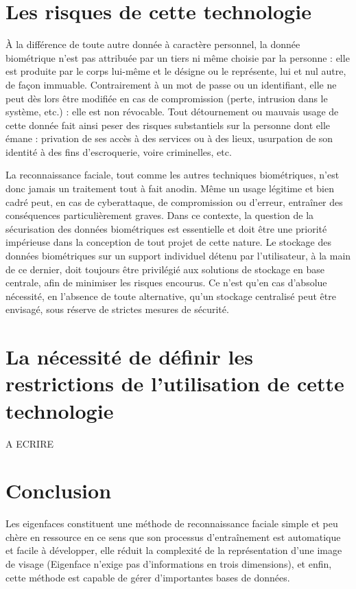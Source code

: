 \documentclass[12pt,french]{article}
\theoremstyle{plain}
\theoremstyle{definition}
\begin{document}
\section{Les risques de cette technologie}

À la différence de toute autre donnée à caractère personnel, la donnée biométrique n’est pas attribuée par un tiers ni même choisie par la personne : elle est produite par le corps lui-même et le désigne ou le représente, lui et nul autre, de façon immuable.
Contrairement à un mot de passe ou un identifiant, elle ne peut dès lors être modifiée en cas de compromission (perte, intrusion dans le système, etc.) : elle est non révocable.
Tout détournement ou mauvais usage de cette donnée fait ainsi peser des risques substantiels sur la personne dont elle émane : privation de ses accès à des services ou à des lieux, usurpation de son identité à des fins d’escroquerie, voire criminelles, etc.

La reconnaissance faciale, tout comme les autres techniques biométriques, n’est donc jamais un traitement tout à fait anodin.
Même un usage légitime et bien cadré peut, en cas de cyberattaque, de compromission ou d’erreur, entraîner des conséquences particulièrement graves.
Dans ce contexte, la question de la sécurisation des données biométriques est essentielle et doit être une priorité impérieuse dans la conception de tout projet de cette nature.
Le stockage des données biométriques sur un support individuel détenu par l’utilisateur, à la main de ce dernier, doit toujours être privilégié aux solutions de stockage en base centrale, afin de minimiser les risques encourus.
Ce n’est qu’en cas d’absolue nécessité, en l’absence de toute alternative, qu’un stockage centralisé peut être
envisagé, sous réserve de strictes mesures de sécurité.

\section{La nécessité de définir les restrictions de l'utilisation de cette technologie}

A ECRIRE

\section*{Conclusion}
Les eigenfaces constituent une méthode de reconnaissance faciale simple et peu chère en ressource en ce sens que son processus d'entraînement est automatique et facile à développer,
elle réduit la complexité de la représentation d'une image de visage (Eigenface n'exige pas d'informations en trois dimensions), et enfin, cette méthode est capable de gérer d'importantes bases de données.
\end{document}
